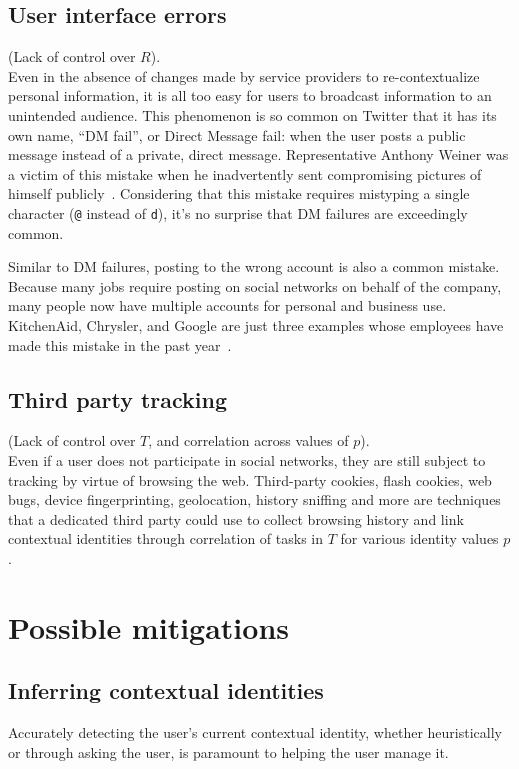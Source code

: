 \documentclass{llncs}
\begin{document}
\subsection{User interface errors}
(Lack of control over $R$).\\
Even in the absence of changes made by service providers to re-contextualize
personal information, it is all too easy for users to broadcast information to
an unintended audience. This phenomenon is so common on Twitter that it has its
own name, ``DM fail'', or Direct Message fail: when the user posts a public
message instead of a private, direct message. Representative Anthony Weiner was
a victim of this mistake when he inadvertently sent compromising pictures of
himself publicly~\cite{weiner}. Considering that this mistake requires
mistyping a single character (\texttt{@} instead of \texttt{d}), it's no
surprise that DM failures are exceedingly common.

Similar to DM failures, posting to the wrong account is also a common mistake.
Because many jobs require posting on social networks on behalf of the company,
many people now have multiple accounts for personal and business use.
KitchenAid, Chrysler, and Google are just three examples whose employees have
made this mistake in the past year~\cite{kitchenaid,chrysler,yegge}.

\subsection{Third party tracking}
\label{sec:tracking}
(Lack of control over $T$, and correlation across values of $p$).\\
Even if a user does not participate in social networks, they are still subject
to tracking by virtue of browsing the web. Third-party cookies, flash cookies,
web bugs, device fingerprinting, geolocation, history sniffing and more are
techniques that a dedicated third party could use to collect browsing history
and link contextual identities through correlation of tasks in $T$ for various
identity values $p$.

\section{Possible mitigations}

\subsection{Inferring contextual identities}
Accurately detecting the user's current contextual identity, whether
heuristically or through asking the user, is paramount to helping the user
manage it.
\end{document}
